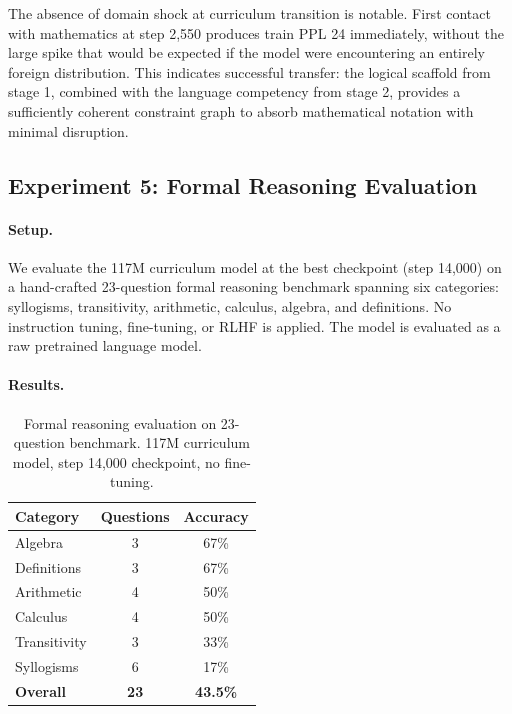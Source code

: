 \documentclass[10pt,a4paper]{article}
\begin{document}
The absence of domain shock at curriculum transition is notable. First contact with mathematics at step 2,550 produces train PPL 24 immediately, without the large spike that would be expected if the model were encountering an entirely foreign distribution. This indicates successful transfer: the logical scaffold from stage 1, combined with the language competency from stage 2, provides a sufficiently coherent constraint graph to absorb mathematical notation with minimal disruption.

\subsection{Experiment 5: Formal Reasoning Evaluation}

\paragraph{Setup.} We evaluate the 117M curriculum model at the best checkpoint (step 14,000) on a hand-crafted 23-question formal reasoning benchmark spanning six categories: syllogisms, transitivity, arithmetic, calculus, algebra, and definitions. No instruction tuning, fine-tuning, or RLHF is applied. The model is evaluated as a raw pretrained language model.

\paragraph{Results.}

\begin{table}[h]
\centering
\caption{Formal reasoning evaluation on 23-question benchmark. 117M curriculum model, step 14,000 checkpoint, no fine-tuning.}
\label{tab:reasoning}
\vspace{4pt}
\begin{tabular}{lcc}
\toprule
Category & Questions & Accuracy \\
\midrule
Algebra & 3 & 67\% \\
Definitions & 3 & 67\% \\
Arithmetic & 4 & 50\% \\
Calculus & 4 & 50\% \\
Transitivity & 3 & 33\% \\
Syllogisms & 6 & 17\% \\
\midrule
\textbf{Overall} & \textbf{23} & \textbf{43.5\%} \\
\bottomrule
\end{tabular}
\end{table}
\end{document}
